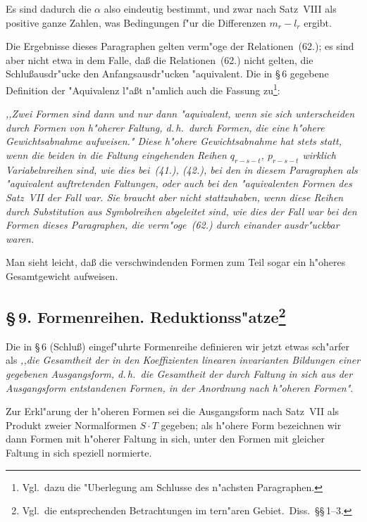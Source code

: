 \documentclass[11pt,a4paper]{article}
\begin{document}
Es sind dadurch die $\alpha$ also eindeutig bestimmt, und zwar nach Satz~VIII
als positive ganze Zahlen, was Bedingungen f"{u}r die Differenzen $m_{r}-l_{r}$ ergibt.

Die Ergebnisse dieses Paragraphen gelten verm"{o}ge der Relationen~(62.);
es sind aber nicht etwa in dem Falle, da\ss{} die Relationen~(62.) nicht
gelten, die Schlu\ss{}ausdr"{u}cke den Anfangsausdr"{u}cken "{a}quivalent. Die in
\S\,6 gegebene Definition der "{A}quivalenz l"{a}\ss{}t n"{a}mlich auch die Fassung
zu\footnote{Vgl.\ dazu die "{U}berlegung am Schlusse des n"{a}chsten Paragraphen.}:

\smallskip
\emph{,,Zwei Formen sind dann und nur dann "{a}quivalent, wenn sie sich
unterscheiden durch Formen von h"{o}herer Faltung, d.\,h.\ durch Formen,
die eine h"{o}here Gewichtsabnahme aufweisen."{} Diese h"{o}here Gewichtsabnahme
hat stets statt, wenn die beiden in die Faltung eingehenden Reihen $q_{r-s-t}$,
$p_{r-s-t}$ wirklich Variabelnreihen sind, wie dies bei~(41.), (42.), bei den in
diesem Paragraphen als "{a}quivalent auftretenden Faltungen, oder auch bei
den "{a}quivalenten Formen des Satz~VII der Fall war. Sie braucht aber
nicht stattzuhaben, wenn diese Reihen durch Substitution aus Symbolreihen
abgeleitet sind, wie dies der Fall war bei den Formen dieses Paragraphen,
die verm"{o}ge~(62.) durch einander ausdr"{u}ckbar waren.}
\smallskip

Man sieht leicht, da\ss{} die verschwindenden Formen zum Teil sogar ein
h"{o}heres Gesamtgewicht aufweisen.


\subsection*{\S\,9. Formenreihen. Reduktionss"{a}tze\footnote{Vgl.\ die entsprechenden
Betrachtungen im tern"{a}ren Gebiet.\ Diss.\ \S\S\,1--3.}}

Die in \S\,6 (Schlu\ss) eingef"{u}hrte Formenreihe definieren wir jetzt etwas
sch"{a}rfer als \emph{,,die Gesamtheit der in den Koeffizienten linearen
invarianten Bildungen einer gegebenen Ausgangsform, d.\,h.\ die Gesamtheit
der durch Faltung in sich aus der Ausgangsform entstandenen Formen, in
der Anordnung nach h"{o}heren Formen"{}}.

Zur Erkl"{a}rung der h"{o}heren Formen sei die Ausgangsform nach Satz~VII
als Produkt zweier Normalformen $S\cdot T$ gegeben; als h"{o}here Form
bezeichnen wir dann Formen mit h"{o}herer Faltung in sich, unter den
Formen mit gleicher Faltung in sich speziell normierte.
\end{document}

